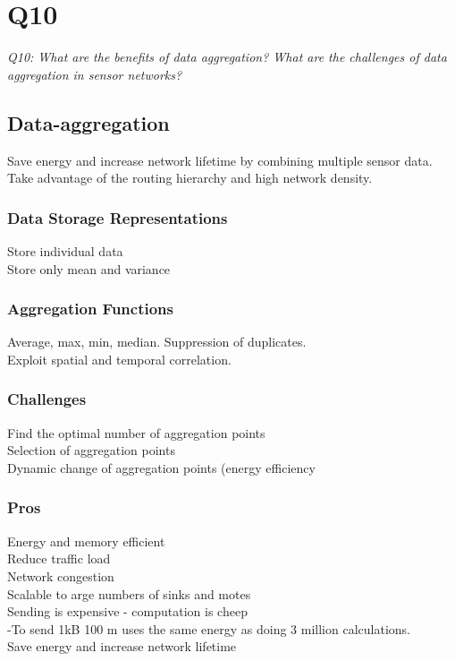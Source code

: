 \chapter{Q10}
\emph{Q10: What are the benefits of data aggregation? What are the challenges
of data aggregation in sensor networks?}

\section{Data-aggregation}
Save energy and increase network lifetime by combining multiple sensor data.
\\
Take advantage of the routing hierarchy and high network density.

\subsection{Data Storage Representations}
Store individual data
\\
Store only mean and variance

\subsection{Aggregation Functions}
Average, max, min, median.
Suppression of duplicates.
\\
Exploit spatial and temporal correlation.

\subsection{Challenges}
Find the optimal number of aggregation points
\\
Selection of aggregation points
\\
Dynamic change of aggregation points (energy efficiency

\subsection{Pros}
Energy and memory efficient
\\
Reduce traffic load
\\
Network congestion
\\
Scalable to arge numbers of sinks and motes
\\
Sending is expensive - computation is cheep
\\
-To send 1kB 100 m uses the same energy as doing 3 million calculations.
\\
Save energy and increase network lifetime

